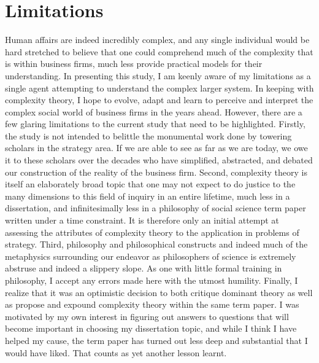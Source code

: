 \documentclass[12pt]{article}
\begin{document}
\section{Limitations}\label{S:Limitations}
Human affairs are indeed incredibly complex, and any single individual would be hard stretched to believe that one could comprehend much of the complexity that is within business firms, much less provide practical models for their understanding. In presenting this study, I am keenly aware of my limitations as a single agent attempting to understand the complex larger system. In keeping with complexity theory,  I hope to evolve, adapt and learn to perceive and interpret the complex social world of business firms in the years ahead. However, there are a few glaring limitations to the current study that need to be highlighted. Firstly, the study is not intended to belittle the monumental work done by towering scholars in the strategy area. If we are able to see as far as we are today, we owe it to these scholars over the decades who have simplified, abstracted, and debated our construction of the reality of the business firm. Second, complexity theory is itself an elaborately broad topic that one may not expect to do justice to the many dimensions to this field of inquiry in an entire lifetime, much less in a dissertation, and infinitesimally less in a philosophy of social science term paper written under a time constraint. It is therefore only an initial attempt at assessing the attributes of complexity theory to the application in problems of strategy. Third, philosophy and philosophical constructs and indeed much of the metaphysics surrounding our endeavor as philosophers of science is extremely abstruse and indeed a slippery slope. As one with little formal training in philosophy, I accept any errors made here with the utmost humility. Finally, I realize that it was an optimistic decision to both critique dominant theory as well as propose and expound complexity theory within the same term paper. I was motivated by my own interest in figuring out answers to questions that will become important in choosing my dissertation topic, and while I think I have helped my cause, the term paper has turned out less deep and substantial that I would have liked. That counts as yet another lesson learnt.
\end{document}
